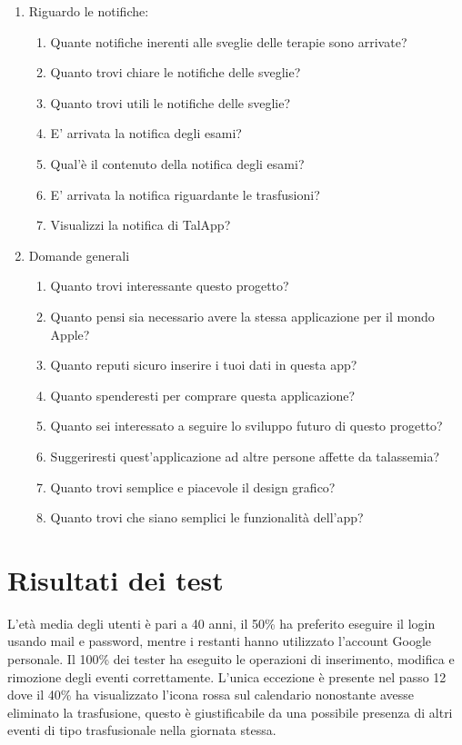 \documentclass[12pt,a4paper,openright,twoside]{report}
\begin{document}
\begin{enumerate}
    \item Riguardo le notifiche:
    \begin{enumerate}
        \item Quante notifiche inerenti alle sveglie delle terapie sono arrivate?
        \item Quanto trovi chiare le notifiche delle sveglie?
        \item Quanto trovi utili le notifiche delle sveglie?
        \item E' arrivata la notifica degli esami?
        \item Qual'è il contenuto della notifica degli esami?
        \item E' arrivata la notifica riguardante le trasfusioni?
        \item Visualizzi la notifica di TalApp?
    \end{enumerate}
    
    \item Domande generali
    \begin{enumerate}
        \item Quanto trovi interessante questo progetto?
        \item Quanto pensi sia necessario avere la stessa applicazione per il mondo Apple?
        \item Quanto reputi sicuro inserire i tuoi dati in questa app?
        \item Quanto spenderesti per comprare questa applicazione?
        \item Quanto sei interessato a seguire lo sviluppo futuro di questo progetto?
        \item Suggeriresti quest'applicazione ad altre persone affette da talassemia?
        \item Quanto trovi semplice e piacevole il design grafico?
        \item Quanto trovi che siano semplici le funzionalità dell'app?
    \end{enumerate}
\end{enumerate}

\section{Risultati dei test}
L'età media degli utenti è pari a 40 anni, il 50\% ha preferito eseguire il login usando mail e password, mentre i restanti hanno utilizzato l'account Google personale. Il 100\% dei tester ha eseguito le operazioni di inserimento, modifica e rimozione degli eventi correttamente. L'unica eccezione è presente nel passo 12 dove il 40\% ha visualizzato l'icona rossa sul calendario nonostante avesse eliminato la trasfusione, questo è giustificabile da una possibile presenza di altri eventi di tipo trasfusionale nella giornata stessa.
\end{document}
